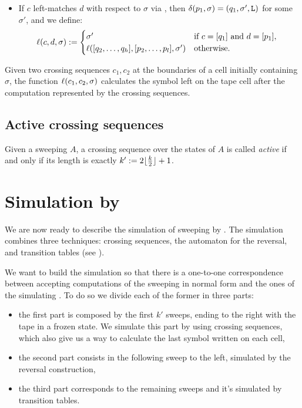 \begin{defn}
\begin{itemize}
\begin{equation*}
		      \end{equation*}
		\item If $c$ left-matches $d$ with respect to $\sigma$ via , then $\delta(p_1,\sigma)=(q_1,\sigma',\mathtt L)$ for some $\sigma'$, and we define:
		      \begin{equation*}
			      \ell(c,d,\sigma):=\begin{cases}
				      \sigma'                                        & \text{if } c=[q_1] \text{ and } d=[p_1],~~ \\
				      \ell([q_2,\dots,q_h],[p_2,\dots,p_l],\sigma') & \text{otherwise}.
			      \end{cases}
		      \end{equation*}
	\end{itemize}
\end{defn}
Given two crossing sequences $c_1,c_2$ at the boundaries of a cell initially containing $\sigma$, the function $\ell(c_1,c_2,\sigma)$ calculates the symbol left on the tape cell after the computation represented by the crossing sequences.


\subsection{Active crossing sequences}
\begin{defn}
	Given a sweeping \kLA $A$, a crossing sequence over the states of $A$ is called \emph{active} if and only if its length is exactly $k':=2\lfloor \frac{k}{2} \rfloor+1$.
\end{defn}



\section{Simulation by \NFA}\label{sec:swkdla-to-NFA}
We are now ready to describe the simulation of sweeping \kDLAs by \ONFAs.
The simulation combines three techniques: crossing sequences, the automaton for the reversal, and transition tables (see ).

We want to build the simulation so that there is a one-to-one correspondence between accepting computations of the sweeping \kDLA in normal form and the ones of the simulating \NFA.
To do so we divide each of the former in three parts:
\begin{itemize}
	\item the first part is composed by the first $k'$ sweeps, ending to the right with the tape in a frozen state. We simulate this part by using crossing sequences, which also give us a way to calculate the last symbol written on each cell,
	\item the second part consists in the following sweep to the left, simulated by the reversal construction,
	\item the third part corresponds to the remaining sweeps and it's simulated by transition tables.
\end{itemize}

